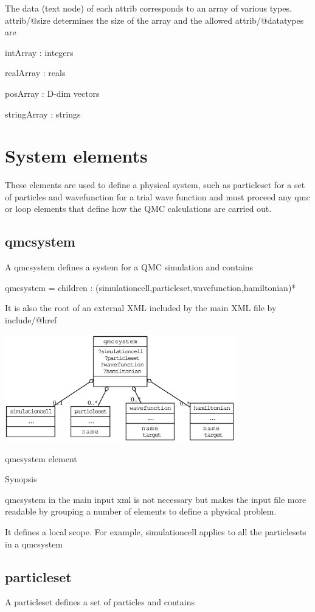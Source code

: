 The data (text node) of each attrib corresponds to an array of various types. {\ttfamily attrib/@size} determines the size of the array and the allowed {\ttfamily attrib/@datatype}s are
\begin{DoxyItemize}
\item int\-Array \-: integers
\item real\-Array \-: reals
\item pos\-Array \-: D-\/dim vectors
\item string\-Array \-: strings
\end{DoxyItemize}\section{System elements}\label{a00004_systemX}
These elements are used to define a physical system, such as {\ttfamily particleset} for a set of particles and {\ttfamily wavefunction} for a trial wave function and must proceed any {\ttfamily qmc} or {\ttfamily loop} elements that define how the Q\-M\-C calculations are carried out.\subsection{qmcsystem}\label{a00004_qmcsystemX}
A {\ttfamily qmcsystem} defines a system for a Q\-M\-C simulation and contains 
\begin{DoxyCode}
qmcsystem = 
  children : (simulationcell,particleset,wavefunction,hamiltonian)*
\end{DoxyCode}
 It is also the root of an external X\-M\-L included by the main X\-M\-L file by {\ttfamily include/@href}


\begin{DoxyImage}
\includegraphics[width=0.75\textwidth,height=\textheight/2,keepaspectratio=true]{dot_qmcsys}
\caption{qmcsystem element}
\end{DoxyImage}
 Synopsis
\begin{DoxyItemize}
\item {\ttfamily qmcsystem} in the main input xml is not necessary but makes the input file more readable by grouping a number of elements to define a physical problem.
\item It defines a local scope. For example, {\ttfamily simulationcell} applies to all the {\ttfamily particleset}s in a {\ttfamily qmcsystem}
\end{DoxyItemize}\subsection{particleset}\label{a00004_particlesetX}
A {\ttfamily particleset} defines a set of particles and contains


